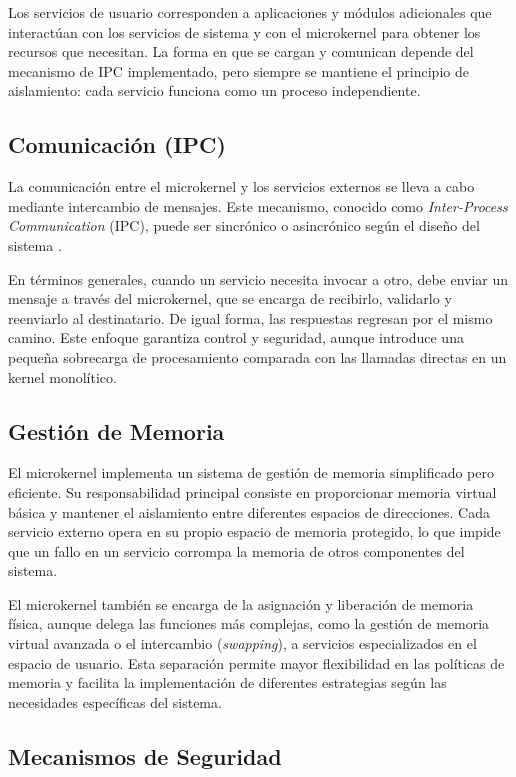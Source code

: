 \documentclass[12pt,a4paper]{article}
\begin{document}
Los servicios de usuario corresponden a aplicaciones y módulos adicionales que interactúan con los servicios de sistema y con el microkernel para obtener los recursos que necesitan. La forma en que se cargan y comunican depende del mecanismo de IPC implementado, pero siempre se mantiene el principio de aislamiento: cada servicio funciona como un proceso independiente.

\subsection{Comunicación (IPC)}

La comunicación entre el microkernel y los servicios externos se lleva a cabo mediante intercambio de mensajes. Este mecanismo, conocido como \textit{Inter-Process Communication} (IPC), puede ser sincrónico o asincrónico según el diseño del sistema \cite{heiser2008role}.

En términos generales, cuando un servicio necesita invocar a otro, debe enviar un mensaje a través del microkernel, que se encarga de recibirlo, validarlo y reenviarlo al destinatario. De igual forma, las respuestas regresan por el mismo camino. Este enfoque garantiza control y seguridad, aunque introduce una pequeña sobrecarga de procesamiento comparada con las llamadas directas en un kernel monolítico.

\subsection{Gestión de Memoria}

El microkernel implementa un sistema de gestión de memoria simplificado pero eficiente. Su responsabilidad principal consiste en proporcionar memoria virtual básica y mantener el aislamiento entre diferentes espacios de direcciones. Cada servicio externo opera en su propio espacio de memoria protegido, lo que impide que un fallo en un servicio corrompa la memoria de otros componentes del sistema.

El microkernel también se encarga de la asignación y liberación de memoria física, aunque delega las funciones más complejas, como la gestión de memoria virtual avanzada o el intercambio (\textit{swapping}), a servicios especializados en el espacio de usuario. Esta separación permite mayor flexibilidad en las políticas de memoria y facilita la implementación de diferentes estrategias según las necesidades específicas del sistema.

\subsection{Mecanismos de Seguridad}
\end{document}
